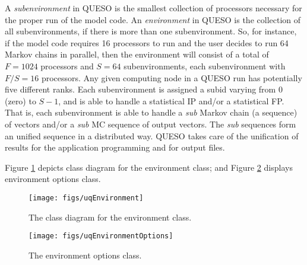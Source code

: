 A {\it subenvironment} in QUESO is the smallest collection of processors necessary for the proper run of the model code.
An {\it environment} in QUESO is the collection of all subenvironments, if there is more than one subenvironment.
So, for instance, if the model code requires 16 processors to run and the user decides to run 64 Markov chains in parallel,
then the environment will consist of a total of $F=1024$ processors and $S=64$ subenvironments, each subenvironment with $F/S=16$ processors.
Any given computing node in a QUESO run has potentially five different ranks.
Each subenvironment is assigned a subid varying from $0$ (zero) to $S-1$, and is able to handle a statistical IP and/or a statistical FP.
That is, each subenvironment is able to handle a {\it sub} Markov chain (a sequence) of vectors and/or a {\it sub} MC sequence of output vectors.
The {\it sub} sequences form an unified sequence in a distributed way.
QUESO takes care of the unification of results for the application programming and for output files.


Figure \ref{fig-env-class} depicts class diagram for the environment class; and Figure  \ref{fig-env-options-class} displays environment options class.%

\begin{figure}[!hp]
\centering
\texttt{[image: figs/uqEnvironment]}
\vspace*{-8pt}
\caption{The class diagram for the environment class.}
\label{fig-env-class}
\end{figure}

\begin{figure}[hp]
\centering
\texttt{[image: figs/uqEnvironmentOptions]}
\vspace*{-8pt}
\caption{The environment options class.}
\label{fig-env-options-class}
\end{figure}

